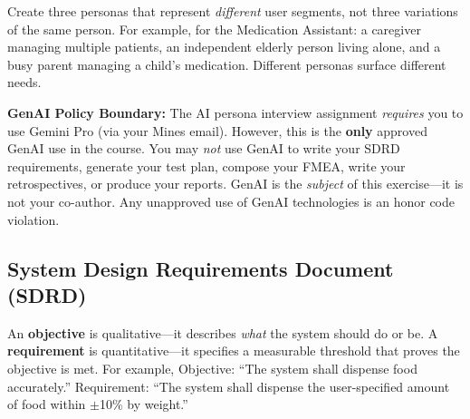 \documentclass[11pt,letterpaper]{article}
\begin{document}
\begin{protip}
Create three personas that represent \textit{different} user segments, not three variations of the same person. For example, for the Medication Assistant: a caregiver managing multiple patients, an independent elderly person living alone, and a busy parent managing a child's medication. Different personas surface different needs.
\end{protip}

\begin{warnbox}
\textbf{GenAI Policy Boundary:} The AI persona interview assignment \textit{requires} you to use Gemini Pro (via your Mines email). However, this is the \textbf{only} approved GenAI use in the course. You may \textit{not} use GenAI to write your SDRD requirements, generate your test plan, compose your FMEA, write your retrospectives, or produce your reports. GenAI is the \textit{subject} of this exercise---it is not your co-author. Any unapproved use of GenAI technologies is an honor code violation.
\end{warnbox}

\subsection{System Design Requirements Document (SDRD)}

\begin{faqbox}
An \textbf{objective} is qualitative---it describes \textit{what} the system should do or be. A \textbf{requirement} is quantitative---it specifies a measurable threshold that proves the objective is met. For example, Objective: ``The system shall dispense food accurately.'' Requirement: ``The system shall dispense the user-specified amount of food within $\pm$10\% by weight.''
\end{faqbox}
\end{document}
